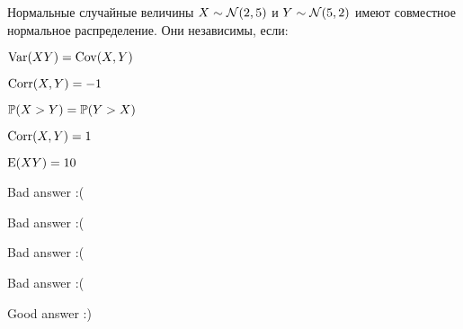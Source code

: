 
\begin{question}
Нормальные случайные величины \(X\sim \cN (2,5)\) и \(Y\sim\cN (5,2)\)
имеют совместное нормальное распределение. Они независимы, если:
\begin{answerlist}
  \item \(\Var(XY)=\Cov(X,Y)\)
  \item \(\Corr(X,Y)=-1\)
  \item \(\P(X>Y)=\P(Y>X)\)
  \item \(\Corr(X,Y)=1\)
  \item \(\E(XY)=10\)
\end{answerlist}
\end{question}

\begin{solution}
\begin{answerlist}
  \item Bad answer :(
  \item Bad answer :(
  \item Bad answer :(
  \item Bad answer :(
  \item Good answer :)
\end{answerlist}
\end{solution}

